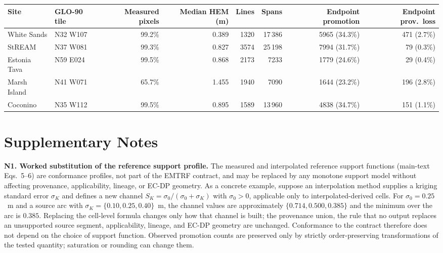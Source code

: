 \documentclass[11pt]{article}
\begin{document}
\begin{center}\scriptsize
\begin{tabular}{@{}llrrrrrr@{}}
\toprule
Site & GLO-90 tile & Measured pixels & Median HEM (m) & Lines & Spans & Endpoint promotion & Endpoint prov.\ loss \\
\midrule
White Sands & N32 W107 & 99.2\% & 0.389 & 1320 & 17\,386 & 5965 (34.3\%) & 471 (2.7\%) \\
StREAM & N37 W081 & 99.3\% & 0.827 & 3574 & 25\,198 & 7994 (31.7\%) & 79 (0.3\%) \\
Estonia Tava & N59 E024 & 99.5\% & 0.868 & 2173 & 7233 & 1779 (24.6\%) & 29 (0.4\%) \\
Marsh Island & N41 W071 & 65.7\% & 1.455 & 1940 & 7090 & 1644 (23.2\%) & 196 (2.8\%) \\
Coconino & N35 W112 & 99.5\% & 0.895 & 1589 & 13\,960 & 4838 (34.7\%) & 151 (1.1\%) \\
\bottomrule
\end{tabular}
\end{center}

\section*{Supplementary Notes}

\noindent\textbf{N1. Worked substitution of the reference support profile.} The measured and interpolated
reference support functions (main-text Eqs.~5--6) are conformance profiles, not part of the EMTRF contract, and
may be replaced by any monotone support model without affecting provenance, applicability, lineage, or EC-DP
geometry. As a concrete example, suppose an interpolation method supplies a kriging standard error $\sigma_K$ and
defines a new channel $S_K=\sigma_0/(\sigma_0+\sigma_K)$ with $\sigma_0>0$, applicable only to
interpolated-derived cells. For $\sigma_0=0.25$~m and a source arc with $\sigma_K=\{0.10,0.25,0.40\}$~m, the
channel values are approximately $\{0.714,0.500,0.385\}$ and the minimum over the arc is $0.385$. Replacing the
cell-level formula changes only how that channel is built; the provenance union, the rule that no output replaces an unsupported source segment,
applicability, lineage, and EC-DP geometry are unchanged. Conformance to the contract therefore does not depend on the choice of support function. Observed promotion counts are
preserved only by strictly order-preserving transformations of the tested quantity; saturation or rounding can change them.
\end{document}
